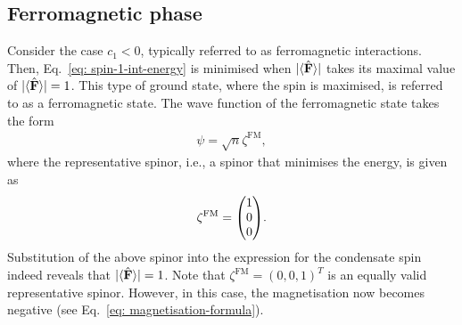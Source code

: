 \subsection{Ferromagnetic phase}
Consider the case \(c_1 < 0 \), typically referred to as ferromagnetic
interactions.
Then, Eq.~\eqref{eq: spin-1-int-energy} is minimised when \(|\langle \hat{\vb{F}} \rangle | \) takes
its maximal value of \(|\langle \hat{\vb{F}} \rangle |=1\).
This type of ground state, where the spin is maximised, is referred to as a
ferromagnetic state.
The wave function of the ferromagnetic state takes the form
\begin{align}
    \psi=\sqrt{n}\zeta^\text{FM},
\end{align}
where the representative spinor, i.e., a spinor that minimises the energy, is
given as~\cite{Kawaguchi2012}
\begin{align}
    \zeta^\text{FM} = \mqty(1 \\ 0 \\ 0).
\end{align}
Substitution of the above spinor into the expression for the condensate spin
indeed reveals that \(|\langle \hat{\vb{F}} \rangle |=1\).
Note that \(\zeta^\text{FM}={(0, 0, 1)}^T\) is an equally valid representative
spinor.
However, in this case, the magnetisation now becomes negative (see
Eq.~\eqref{eq: magnetisation-formula}).

